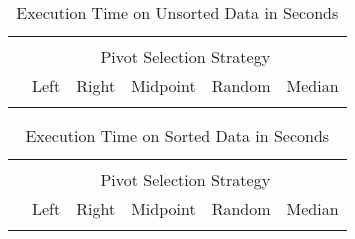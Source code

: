 \begin{table}[H]
\begin{center}
\begin{tabular}{l|lllll}
\hline \\[-0.95em]
& \multicolumn{5}{c}{Pivot Selection Strategy} \\
& \multicolumn{1}{c}{Left} & \multicolumn{1}{c}{Right} & \multicolumn{1}{c}{Midpoint} & \multicolumn{1}{c}{Random} & \multicolumn{1}{c}{Median} \\
\hline \\[-0.9em]

\end{tabular}
\end{center}
\caption{Execution Time on Unsorted Data in Seconds}
\end{table}

\begin{table}[H]
\begin{center}
\begin{tabular}{l|lllll}
\hline \\[-0.95em]
& \multicolumn{5}{c}{Pivot Selection Strategy} \\
& \multicolumn{1}{c}{Left} & \multicolumn{1}{c}{Right} & \multicolumn{1}{c}{Midpoint} & \multicolumn{1}{c}{Random} & \multicolumn{1}{c}{Median} \\
\hline \\[-0.9em]

\end{tabular}
\end{center}
\caption{Execution Time on Sorted Data in Seconds}
\end{table}